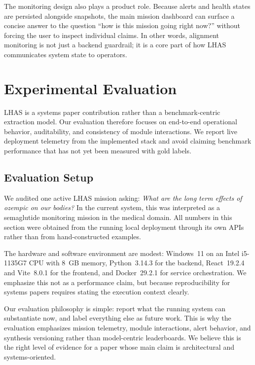 \documentclass[manuscript,screen,review]{jair}
\begin{document}
The monitoring design also plays a product role. Because alerts and health states are persisted alongside snapshots, the main mission dashboard can surface a concise answer to the question ``how is this mission going right now?'' without forcing the user to inspect individual claims. In other words, alignment monitoring is not just a backend guardrail; it is a core part of how LHAS communicates system state to operators.

\section{Experimental Evaluation}
LHAS is a systems paper contribution rather than a benchmark-centric extraction model. Our evaluation therefore focuses on end-to-end operational behavior, auditability, and consistency of module interactions. We report live deployment telemetry from the implemented stack and avoid claiming benchmark performance that has not yet been measured with gold labels.

\subsection{Evaluation Setup}
We audited one active LHAS mission asking: \emph{What are the long term effects of ozempic on our bodies?} In the current system, this was interpreted as a semaglutide monitoring mission in the medical domain. All numbers in this section were obtained from the running local deployment through its own APIs rather than from hand-constructed examples.

The hardware and software environment are modest: Windows~11 on an Intel i5-1135G7 CPU with 8~GB memory, Python~3.14.3 for the backend, React~19.2.4 and Vite~8.0.1 for the frontend, and Docker~29.2.1 for service orchestration. We emphasize this not as a performance claim, but because reproducibility for systems papers requires stating the execution context clearly.

Our evaluation philosophy is simple: report what the running system can substantiate now, and label everything else as future work. This is why the evaluation emphasizes mission telemetry, module interactions, alert behavior, and synthesis versioning rather than model-centric leaderboards. We believe this is the right level of evidence for a paper whose main claim is architectural and systems-oriented.
\end{document}
